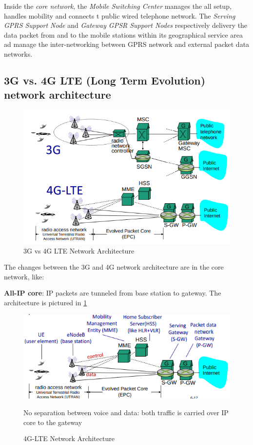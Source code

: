 \documentclass[10pt,a4paper]{report}
\theoremstyle{definition}
\begin{document}
Inside the \textit{core network}, the \textit{Mobile Switching Center} manages the all setup, handles mobility and connects t public wired telephone network. The \textit{Serving GPRS Support Node} and \textit{Gateway GPSR Support Nodes} respectively delivery the data packet from and to the mobile stations within its geographical service area ad manage the inter-networking between GPRS network and external packet data networks. 

\subsection{3G vs. 4G LTE (Long Term Evolution) network architecture}\label{sec:3g-vs-4g-lte-long-term-evolution-network-architecture}
\begin{figure}[h!]
	\centering\includegraphics[scale=0.50]{images/Pasted image 20230308162341.png}
	\caption{3G vs 4G LTE Network Architecture}
\end{figure}


The changes between the 3G and 4G network architecture are in the core network, like:
\begin{itemize}
	\item 
	\textbf{All-IP core}: IP packets are tunneled from base station to gateway. The architecture is pictured in \ref{all-ip-core-arch}
	\begin{figure}[h]
		\centering\includegraphics[scale=0.60]{images/Pasted image 20230309160003.png}
		\caption{4G-LTE Network Architecture}
		\label{all-ip-core-arch}	
	\item No separation between voice and data: both traffic is carried over IP core to the gateway
\end{figure}
	
\end{itemize}
\end{document}
